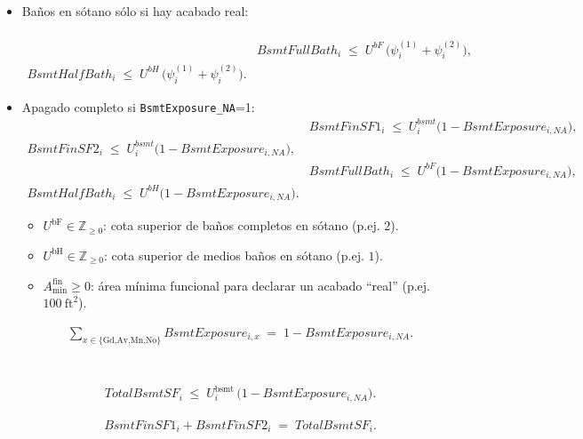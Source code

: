 \begin{itemize}
    \item {Baños en sótano sólo si hay acabado real:}\\
\\
\begin{align}
& BsmtFullBath_i \;\le\; U^{bF}\,\big(\psi^{(1)}_i + \psi^{(2)}_i\big), \qquad \\
  BsmtHalfBath_i \;\le\; U^{bH}\,\big(\psi^{(1)}_i + \psi^{(2)}_i\big). \label{eq:b-baths}
\end{align}

    \item {Apagado completo si \texttt{BsmtExposure\_NA}=1:}\\
\begin{align}
& BsmtFinSF1_i \;\le\; U^{bsmt}_i \big(1 - BsmtExposure_{i,NA}\big), \qquad \\
  BsmtFinSF2_i \;\le\; U^{bsmt}_i \big(1 - BsmtExposure_{i,NA}\big), \\
& BsmtFullBath_i \;\le\; U^{bF}\big(1 - BsmtExposure_{i,NA}\big), \qquad \\
  BsmtHalfBath_i \;\le\; U^{bH}\big(1 - BsmtExposure_{i,NA}\big). \label{eq:b-off}
\end{align}
    \begin{itemize}
        \item $U^{\text{bF}}\in\mathbb{Z}_{\ge 0}$: cota superior de baños completos en sótano (p.ej. $2$).
        \item $U^{\text{bH}}\in\mathbb{Z}_{\ge 0}$: cota superior de medios baños en sótano (p.ej. $1$).
        \item $A^{\text{fin}}_{\min}\ge 0$: área mínima funcional para declarar un acabado “real” (p.ej. $100~\text{ft}^2$).
    \end{itemize}

\begin{align}

& \sum_{x\in \{\text{Gd,Av,Mn,No}\}} BsmtExposure_{i,x}
   \;=\; 1 - BsmtExposure_{i,NA}. \label{eq:exp-exist}
\end{align}\\
\\

\begin{align}
& TotalBsmtSF_i \;\le\; U_{i}^{\text{bsmt}}\,\big(1 - BsmtExposure_{i,NA}\big). \label{eq:bsmt-cap}
\end{align}

\begin{align}
& BsmtFinSF1_i + BsmtFinSF2_i \;=\; TotalBsmtSF_i. \label{eq:bsmt-sum}
\end{align}


\end{itemize}

